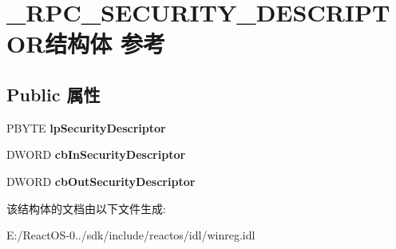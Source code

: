 \hypertarget{struct___r_p_c___s_e_c_u_r_i_t_y___d_e_s_c_r_i_p_t_o_r}{}\section{\+\_\+\+R\+P\+C\+\_\+\+S\+E\+C\+U\+R\+I\+T\+Y\+\_\+\+D\+E\+S\+C\+R\+I\+P\+T\+O\+R结构体 参考}
\label{struct___r_p_c___s_e_c_u_r_i_t_y___d_e_s_c_r_i_p_t_o_r}
\subsection*{Public 属性}
\begin{DoxyCompactItemize}
\item 
\mbox{\label{struct___r_p_c___s_e_c_u_r_i_t_y___d_e_s_c_r_i_p_t_o_r_aed8d4af44dc643ff939b58c5be3e9cb8}} 
P\+B\+Y\+TE {\bfseries lp\+Security\+Descriptor}
\item 
\mbox{\label{struct___r_p_c___s_e_c_u_r_i_t_y___d_e_s_c_r_i_p_t_o_r_a9f6d7efdf0ec66c34182a5e031e00733}} 
D\+W\+O\+RD {\bfseries cb\+In\+Security\+Descriptor}
\item 
\mbox{\label{struct___r_p_c___s_e_c_u_r_i_t_y___d_e_s_c_r_i_p_t_o_r_a7aa172aec676185a071057118f252b5b}} 
D\+W\+O\+RD {\bfseries cb\+Out\+Security\+Descriptor}
\end{DoxyCompactItemize}


该结构体的文档由以下文件生成\+:\begin{DoxyCompactItemize}
\item 
E\+:/\+React\+O\+S-\/0../sdk/include/reactos/idl/winreg.\+idl\end{DoxyCompactItemize}
